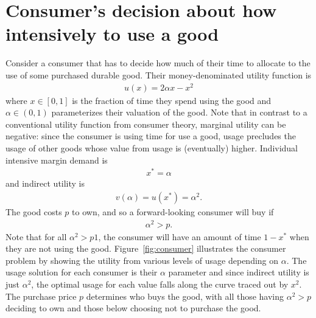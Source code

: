 \documentclass[11pt]{article}
\begin{document}
\section{Consumer's decision about how intensively to use a good} 
Consider a consumer that has to decide how much of their time to allocate to the use of some purchased durable good. 
Their money-denominated utility function is
\begin{align}
u(x) = 2 \alpha x - x^2  
\end{align} 
where $x \in [0,1]$ is the fraction of time they spend using the good and $\alpha \in (0,1)$ parameterizes their valuation of the good. 
Note that in contrast to a conventional utility function from consumer theory, marginal utility can be negative:
since the consumer is using time for use a good, usage precludes the usage of other goods whose value from usage is (eventually) higher. 
Individual intensive margin demand is  
\begin{align}
x^* = \alpha  
\end{align} 
and indirect utility is 
\begin{align}
v(\alpha) = u(x^*) = \alpha^2.  
\end{align} 
The good costs $p$ to own, and so a forward-looking consumer will buy if 
\begin{align} 
\alpha^2 > p. 
\end{align} 
Note that for all $\alpha^2 > p1$, the consumer will have an amount of time $1 - x^*$ when they are not using the good.
Figure~\ref{fig:consumer} illustrates the consumer problem by showing the utility from various levels of usage depending on $\alpha$.
The usage solution for each consumer is their $\alpha$ parameter and since indirect utility is just $\alpha^2$, the optimal usage for each value falls along the curve traced out by $x^2$.
The purchase price $p$ determines who buys the good, with all those having $\alpha^2 > p$ deciding to own and those below choosing not to purchase the good. 

\pgfmathsetmacro{\xstarOne}{\alphaOne}%
%

\pgfmathsetmacro{\xstarTwo}{\alphaTwo}%
%

\pgfmathsetmacro{\xstarThree}{\alphaThree}%
%
\end{document}
